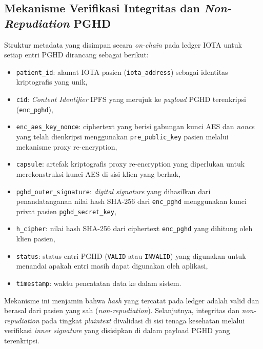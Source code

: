 \subsection{Mekanisme Verifikasi Integritas dan \textit{Non-Repudiation} PGHD}\label{rancangan-mekanisme-integritas-nonrepudiation}

Struktur metadata yang disimpan secara \textit{on-chain} pada ledger IOTA untuk setiap entri PGHD dirancang sebagai berikut:
\begin{itemize}
    \item \verb|patient_id|: alamat IOTA pasien (\verb|iota_address|) sebagai identitas kriptografis yang unik,
    \item \verb|cid|: \textit{Content Identifier} IPFS yang merujuk ke \textit{payload} PGHD terenkripsi (\verb|enc_pghd|),
    \item \verb|enc_aes_key_nonce|: ciphertext yang berisi gabungan kunci AES dan \textit{nonce} yang telah dienkripsi menggunakan \verb|pre_public_key| pasien melalui mekanisme proxy re-encryption,
    \item \verb|capsule|: artefak kriptografis proxy re-encryption yang diperlukan untuk merekonstruksi kunci AES di sisi klien yang berhak,
    \item \verb|pghd_outer_signature|: \textit{digital signature} yang dihasilkan dari penandatanganan nilai hash SHA-256 dari \verb|enc_pghd| menggunakan kunci privat pasien \verb|pghd_secret_key|,
    \item \verb|h_cipher|: nilai hash SHA-256 dari ciphertext \verb|enc_pghd| yang dihitung oleh klien pasien,
    \item \verb|status|: status entri PGHD (\texttt{VALID} atau \texttt{INVALID}) yang digunakan untuk menandai apakah entri masih dapat digunakan oleh aplikasi,
    \item \verb|timestamp|: waktu pencatatan data ke dalam sistem.
\end{itemize}

Mekanisme ini menjamin bahwa \textit{hash} yang tercatat pada ledger adalah valid dan berasal dari pasien yang sah (\textit{non-repudiation}). 
Selanjutnya, integritas dan \textit{non-repudiation} pada tingkat \textit{plaintext} divalidasi di sisi tenaga kesehatan melalui verifikasi \textit{inner signature} yang disisipkan di dalam payload PGHD yang terenkripsi.
